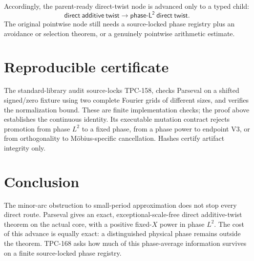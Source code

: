 \documentclass[11pt]{article}
\theoremstyle{definition}
\begin{document}
Accordingly, the parent-ready direct-twist node is advanced only to
a typed child:
\[
 \mathsf{direct\ additive\ twist}
 \longrightarrow
 \mathsf{phase\mbox{-}L^2\ direct\ twist}.
\]
The original pointwise node still needs a source-locked phase
registry plus an avoidance or selection theorem, or a genuinely
pointwise arithmetic estimate.

\section{Reproducible certificate}

The standard-library audit source-locks TPC-158, checks Parseval on a
shifted signed/zero fixture using two complete Fourier grids of
different sizes, and verifies the normalization bound.  These are
finite implementation checks; the proof above establishes the
continuous identity.  Its executable mutation contract rejects
promotion from phase \(L^2\) to a
fixed phase, from a phase power to endpoint V3, or from
orthogonality to M\"obius-specific cancellation.  Hashes certify
artifact integrity only.

\section{Conclusion}

The minor-arc obstruction to small-period approximation does not stop
every direct route.  Parseval gives an exact, exceptional-scale-free
direct additive-twist theorem on the actual core, with a positive
fixed-\(X\) power in phase \(L^2\).  The cost of this advance is
equally exact: a distinguished physical phase remains outside the
theorem.  TPC-168 asks how much of this phase-average information
survives on a finite source-locked phase registry.



\end{document}
